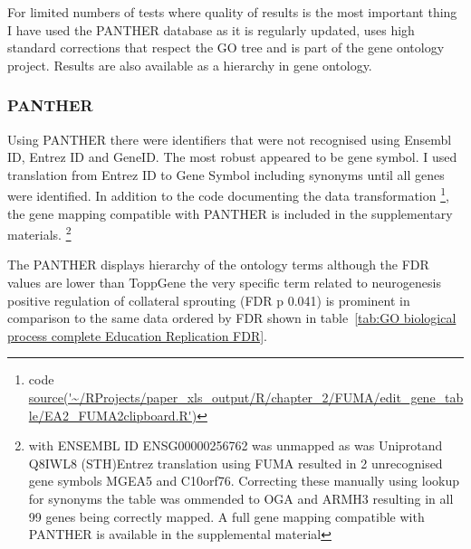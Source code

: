 For limited numbers of tests where quality of results is the most important thing I have used the PANTHER database as it is regularly updated, uses high standard corrections that respect the GO tree and is part of the gene ontology project. Results are also available as a hierarchy in gene ontology. 

\subsubsection{PANTHER}
\label{sec:methods GO Pather}
Using PANTHER there were identifiers that were not recognised using Ensembl ID, Entrez ID and GeneID. The most robust appeared to be gene symbol. I used translation from Entrez ID to Gene Symbol including synonyms until all genes were identified. In addition to the code documenting the data transformation \footnote{code \url{ source('~/RProjects/paper_xls_output/R/chapter_2/FUMA/edit_gene_table/EA2_FUMA2clipboard.R')}}, the gene mapping compatible with PANTHER is included in the supplementary materials.    \footnote{with ENSEMBL ID ENSG00000256762 was unmapped as was Uniprotand Q8IWL8 (STH)Entrez translation using FUMA resulted in 2 unrecognised gene symbols MGEA5 and C10orf76. Correcting these manually using lookup for synonyms the table was ommended to OGA and ARMH3 resulting in all 99 genes being correctly mapped. A full gene mapping compatible with PANTHER is available in the supplemental material}

 The PANTHER displays hierarchy of the ontology terms although the FDR values are lower than ToppGene the very specific term related to neurogenesis positive regulation of collateral sprouting (FDR p 0.041) is prominent in comparison to the same data ordered by FDR shown in table~\ref{tab:GO biological process complete Education Replication FDR}. 

 

